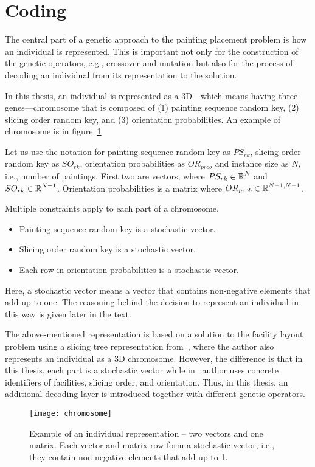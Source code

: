 \section{Coding}\label{sec:coding}

The central part of a genetic approach to the painting placement problem is how an individual is represented.
This is important not only for the construction of the genetic operators, e.g., crossover and mutation but also for the process of decoding an individual from its representation to the solution.


In this thesis, an individual is represented as a 3D—which means having three genes—chromosome that is composed of
(1) painting sequence random key, (2) slicing order random key, and (3) orientation probabilities.
An example of chromosome is in figure~\ref{fig:chromosome}

Let us use the notation for painting sequence random key as $PS_{rk}$,
slicing order random key as $SO_{rk}$,
orientation probabilities as $OR_{prob}$ and instance size as $N$, i.e., number of paintings.
First two are vectors, where $PS_{rk} \in \operatorname*{\mathbb{R}}^N$ and $SO_{rk} \in \operatorname*{\mathbb{R}}^{N-1}$.
Orientation probabilities is a matrix where $OR_{prob} \in \operatorname*{\mathbb{R}}^{N-1, N-1}$.

Multiple constraints apply to each part of a chromosome.

\begin{itemize}
    \item Painting sequence random key is a stochastic vector.
    \item Slicing order random key is a stochastic vector.
    \item Each row in orientation probabilities is a stochastic vector.
\end{itemize}

Here, a stochastic vector means a vector that contains non-negative elements that add up to one.
The reasoning behind the decision to represent an individual in this way is given later in the text.

The above-mentioned representation is based on a solution to the facility layout problem using a slicing tree representation
from~\cite{friedrichIntegratedSlicingTree2018},
where the author also represents an individual as a 3D chromosome.
However, the difference is that in this thesis, each part is a stochastic vector while
in~\cite{friedrichIntegratedSlicingTree2018} author uses concrete identifiers of facilities, slicing order, and orientation.
Thus, in this thesis, an additional decoding layer is introduced together with different genetic operators.

\begin{figure}[htp]
    \texttt{[image: chromosome]}\caption[Example of an individual representation]{
        Example of an individual representation – two vectors and one matrix.
        Each vector and matrix row form a stochastic vector, i.e., they contain non-negative elements that add up to 1.
    }
    \label{fig:chromosome}
\end{figure}
